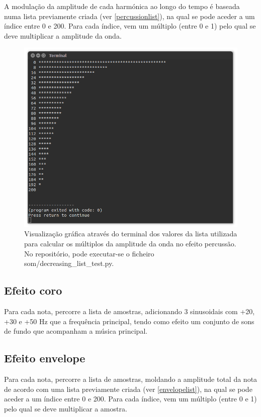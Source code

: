 A modulação da amplitude de cada harmónica ao longo do tempo é baseada numa lista previamente criada (ver \autoref{percussionlist}), na qual se pode aceder a um índice entre 0 e 200. Para cada índice, vem um múltiplo (entre 0 e 1) pelo qual se deve multiplicar a amplitude da onda.

\begin{figure}[htp]
\centering
\includegraphics[width=\textwidth]{images/percussionlist.png}
\caption{Visualização gráfica através do terminal dos valores da lista utilizada para calcular os múltiplos da amplitude da onda no efeito percussão. No repositório, pode executar-se o ficheiro som/decreasing\_list\_test.py.}
\label{percussionlist}
\end{figure}

\subsection{Efeito coro}
Para cada nota, percorre a lista de amostras, adicionando 3 sinusoidais com +20, +30 e +50 Hz que a frequência principal, tendo como efeito um conjunto de sons de fundo que acompanham a música principal.

\subsection{Efeito envelope}
Para cada nota, percorre a lista de amostras, moldando a amplitude total da nota de acordo com uma lista previamente criada (ver \autoref{envelopelist}), na qual se pode aceder a um índice entre 0 e 200. Para cada índice, vem um múltiplo (entre 0 e 1) pelo qual se deve multiplicar a amostra.

